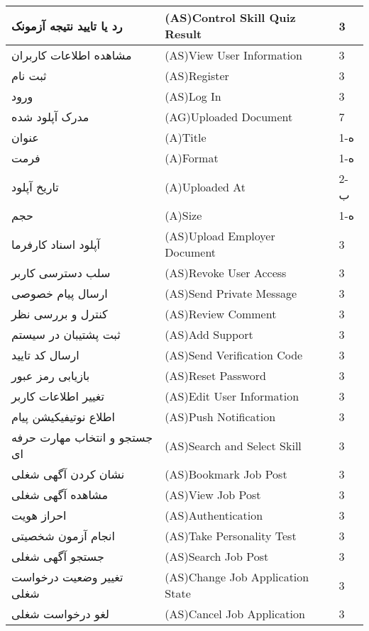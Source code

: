 \documentclass[12pt]{article}
\begin{document}
\begin{longtable}{|l|l|l|}
		رد یا تایید نتیجه آزمونک & (AS)Control Skill Quiz Result & 3     \\
		\hline
		مشاهده اطلاعات کاربران & (AS)View User Information & 3     \\
		\hline
		ثبت نام & (AS)Register & 3     \\
		\hline
		ورود & (AS)Log In & 3     \\
		\hline
		مدرک آپلود شده & (AG)Uploaded Document & 7     \\
		\hline
		عنوان & (A)Title & 1-ه   \\
		\hline
		فرمت & (A)Format & 1-ه   \\
		\hline
		تاریخ آپلود & (A)Uploaded At & 2-ب   \\
		\hline
		حجم & (A)Size & 1-ه   \\
		\hline
		آپلود اسناد کارفرما & (AS)Upload Employer Document & 3     \\
		\hline
		سلب دسترسی کاربر & (AS)Revoke User Access & 3     \\
		\hline
		ارسال پیام خصوصی & (AS)Send Private Message & 3     \\
		\hline
		کنترل و بررسی نظر & (AS)Review Comment & 3     \\
		\hline
		ثبت پشتیبان در سیستم & (AS)Add Support & 3     \\
		\hline
		ارسال کد تایید & (AS)Send Verification Code & 3     \\
		\hline
		بازیابی رمز عبور‌‌ & (AS)Reset Password & 3     \\
		\hline
		تغییر اطلاعات کاربر & (AS)Edit User Information & 3     \\
		\hline
		اطلاع نوتیفیکیشن پیام & (AS)Push Notification & 3     \\
		\hline
		جستجو و انتخاب مهارت حرفه ای & (AS)Search and Select Skill & 3     \\
		\hline
		نشان کردن آگهی شغلی & (AS)Bookmark Job Post & 3     \\
		\hline
		مشاهده آگهی شغلی & (AS)View Job Post & 3     \\
		\hline
		احراز هویت & (AS)Authentication & 3     \\
		\hline
		انجام آزمون شخصیتی & (AS)Take Personality Test & 3     \\
		\hline
		جستجو آگهی شغلی & (AS)Search Job Post & 3     \\
		\hline
		تغییر وضعیت درخواست شغلی & (AS)Change Job Application State & 3     \\
		\hline
		لغو درخواست شغلی & (AS)Cancel Job Application & 3     \\

\end{longtable}
\end{document}
